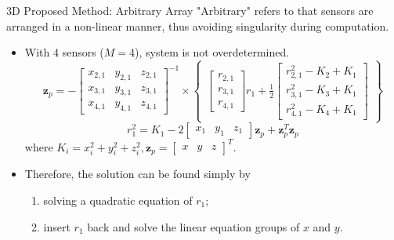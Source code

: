 \documentclass[10pt]{beamer}
\begin{document}
\begin{frame}{3D Proposed Method: Arbitrary Array}
  "Arbitrary" refers to that sensors are arranged in a non-linear manner,
  thus avoiding singularity during computation.
  \begin{itemize}
    \item With \alert{4} sensors ($M = 4$), system is not overdetermined.
            $$\mathbf{z}_p = - \begin{bmatrix}x_{2,1}&y_{2,1}&z_{2,1} \\ x_{3,1}&y_{3,1}&z_{3,1} \\     x_{4,1}&y_{4,1}&z_{4,1}\end{bmatrix}^{-1} \times
              \begin{Bmatrix} \begin{bmatrix}r_{2,1}\\r_{3,1}\\r_{4,1}\end{bmatrix}r_1 + \frac{1}{2}
                              \begin{bmatrix}r_{2,1}^2-K_2+K_1 \\ r_{3,1}^2-K_3+K_1 \\ r_{4,1}^2-K_4+K_1 \end{bmatrix}\end{Bmatrix}$$
            $$r_1^2 = K_1-
              2\begin{bmatrix}x_1&y_1&z_1\end{bmatrix} \mathbf{z}_p+
              \mathbf{z}_p^T \mathbf{z}_p$$
          where $K_i = x_i^2 + y_i^2 + z_i^2, \mathbf{z}_p = \begin{bmatrix}x&y&z\end{bmatrix}^T$.
    \item Therefore, the solution can be found simply by
    \begin{enumerate}
      \item solving a quadratic equation of $r_1$;
      \item insert $r_1$ back and solve the linear equation groups of $x$ and $y$.
    \end{enumerate}
  \end{itemize}
\end{frame}
\end{document}
